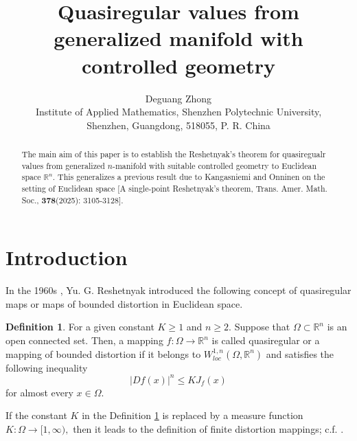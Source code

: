 \documentclass[11pt,twoside]{article}
\title{Quasiregular values from generalized manifold with controlled geometry}
\author{Deguang Zhong \\Institute of Applied Mathematics, Shenzhen Polytechnic University,\\
Shenzhen, Guangdong, 518055, P. R. China\\}
\date{}
\theoremstyle{definition}
\newtheorem{defn}{Definition}[section]
\theoremstyle{remark}
\newcommand{\ntt}{%
  \fontfamily\ttdefault \fontseries\mddefault \fontshape\updefault
  \selectfont
}
\DeclareRobustCommand{\pkg}[1]{{\ntt#1}}
\begin{document}
\maketitle
\begin{abstract}
The main aim of this paper is to establish the Reshetnyak's theorem for quasiregualr values from generalized $n$-manifold with suitable controlled geometry to Euclidean space $\mathbb{R}^{n}.$
 This generalizes a previous result due to Kangasniemi and  Onninen on the setting of Euclidean space 
[A single-point Reshetnyak’s theorem, Trans. Amer. Math. Soc., $\mathbf{378}$(2025): 3105-3128].  
\end{abstract}
\begingroup
\small
\tableofcontents
\endgroup


\newpage %

\section{Introduction}
In the 1960s \cite{Res67}, Yu. G. Reshetnyak  introduced the following concept of quasiregular maps or maps of bounded distortion in Euclidean space. 
  \begin{defn}{\rm\cite{Res67}}\label{01900qs1}
  For a given constant $K\geq1$ and $n\geq2.$ Suppose that $\Omega\subset\mathbb{R}^{n}$  is an open connected set. Then, a mapping $f:\Omega\rightarrow\mathbb{R}^{n}$ is called quasiregular or a mapping of bounded distortion if it belongs to $W_{loc}^{1,n}(\Omega, \mathbb{R}^{n})$ and satisfies the following inequality 
  $$\vert Df(x)\vert^{n}\leq KJ_{f}(x)$$
  for almost every $x\in\Omega.$
  \end{defn}
If the constant $K$ in the Definition \ref{01900qs1} is replaced by a measure function $K:\Omega\rightarrow[1,\infty),$  then it leads to the definition of finite distortion mappings; c.f. \cite{HK14, IM01}.

 
\end{document}

